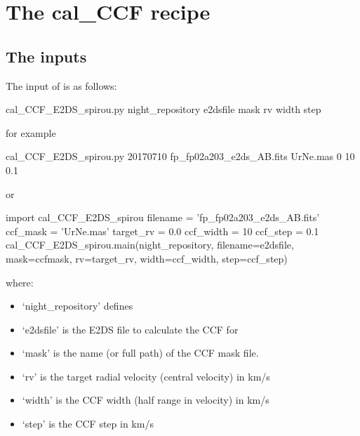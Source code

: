 \clearpage
\newpage
\section{The cal\_CCF recipe}
\label{ch:the_recipes:cal_CCF_E2DS_spirou}


\subsection{The inputs}
The input of \calCCF is as follows:
\begin{cmdbox}
cal_CCF_E2DS_spirou.py night_repository e2dsfile mask rv width step
\end{cmdbox}
\noindent for example
\begin{cmdbox}[title={example}]
cal_CCF_E2DS_spirou.py 20170710 fp_fp02a203_e2ds_AB.fits UrNe.mas 0 10 0.1
\end{cmdbox}
\noindent or
\begin{pythonbox}
import cal_CCF_E2DS_spirou
filename = 'fp_fp02a203_e2ds_AB.fits'
ccf_mask = 'UrNe.mas'
target_rv = 0.0
ccf_width = 10
ccf_step = 0.1
cal_CCF_E2DS_spirou.main(night_repository, filename=e2dsfile, mask=ccfmask, 
                         rv=target_rv, width=ccf_width, step=ccf_step)
\end{pythonbox}

\noindent where:
\begin{itemize}
\item `night\_repository' defines \argnightname
\item `e2dsfile' is the E2DS file to calculate the CCF for
\item `mask' is the name (or full path) of the CCF mask file.


\item `rv' is the target radial velocity (central velocity) in km/s
\item `width' is the CCF width (half range in velocity) in km/s
\item `step' is the CCF step in km/s
\end{itemize}

